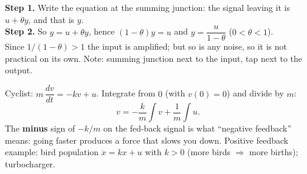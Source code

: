 \begin{workbox}[title={Worked example: Black's amplifier \fr{15} (positive feedback)}]
\begin{center}
\end{center}
\textbf{Step 1.} Write the equation at the summing junction: the signal leaving it is $u+\theta y$, and that is $y$.\\
\textbf{Step 2.} So $y=u+\theta y$, hence $(1-\theta)y=u$ and $\boxed{y=\dfrac{u}{1-\theta}}$ ($0<\theta<1$).\\
Since $1/(1-\theta)>1$ the input is amplified; but so is any noise, so it is not practical on its own.
Note: summing junction next to the input, tap next to the output.
\end{workbox}

\begin{workbox}[title={Worked example: negative feedback from air resistance \fr{16--17}}]
Cyclist: $m\,\dfrac{dv}{dt}=-kv+u$. Integrate from $0$ (with $v(0)=0$) and divide by $m$:
\[ v=-\frac km\int v+\frac1m\int u. \]
The \textbf{minus} sign of $-k/m$ on the fed-back signal is what ``negative feedback'' means: going faster produces a force that slows you down.
Positive feedback example: bird population $\dot x=kx+u$ with $k>0$ (more birds $\Rightarrow$ more births); turbocharger.
\end{workbox}

